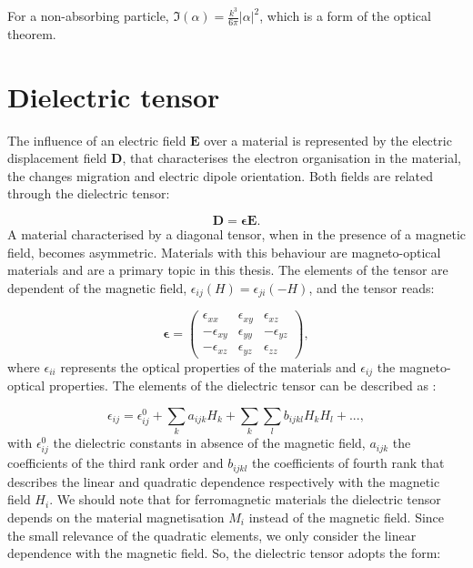 For a non-absorbing particle, $\Im\left(\alpha\right)=\frac{k^3}{6\pi}\left|\alpha\right|^2$, which is a form of the optical theorem.

\section{Dielectric tensor\label{sec:chap2_dielectric_tensor}}

The influence of an electric field $\mathbf{E}$ over a material is represented by the electric displacement field $\mathbf{D}$, that characterises the electron organisation in the material, the changes migration and electric dipole orientation. Both fields are related through the dielectric tensor:

\begin{equation}
\mathbf{D} = \boldsymbol{\epsilon}\mathbf{E}.
\end{equation}
A material characterised by a diagonal tensor, when in the presence of a magnetic field, becomes asymmetric. Materials with this behaviour are magneto-optical materials and are a primary topic in this thesis. The elements of the tensor are dependent of the magnetic field, $\epsilon_{ij}\left(H\right)=\epsilon_{ji}\left(-H\right)$, and the tensor reads:

\begin{equation}
\boldsymbol{\epsilon} = \left(\begin{array}{ccc}
\epsilon_{xx} & \epsilon_{xy} & \epsilon_{xz}\\
-\epsilon_{xy} & \epsilon_{yy} & -\epsilon_{yz}\\
-\epsilon_{xz} & \epsilon_{yz} & \epsilon_{zz}
\end{array}\right),
\end{equation}
where $\epsilon_{ii}$ represents the optical properties of the materials and $\epsilon_{ij}$ the magneto-optical properties. The elements of the dielectric tensor can be described as \cite{sepulveda2003linear}:

\begin{equation}
\epsilon_{ij} = \epsilon_{ij}^{0}+\sum_{k}a_{ijk}H_{k}+\sum_{k}\sum_{l}b_{ijkl}H_{k}H_{l}+...,
\end{equation}
with $\epsilon_{ij}^{0}$ the dielectric constants in absence of the magnetic field, $a_{ijk}$ the coefficients of the third rank order and $b_{ijkl}$ the coefficients of fourth rank that describes the linear and quadratic dependence respectively with the magnetic field $H_{i}$. We should note that for ferromagnetic materials the dielectric tensor depends on the material magnetisation $M_{i}$ instead of the magnetic field. Since the small relevance of the quadratic elements, we only consider the linear dependence with the magnetic field. So, the dielectric tensor adopts the form:

